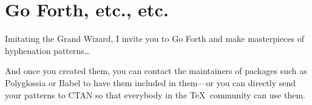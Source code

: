 \documentclass{article}
\begin{document}
\section{Go Forth, etc., etc.}
Imitating the Grand Wizard, I invite you to {\sc Go Forth} and make masterpieces of hyphenation patterns\ldots

And once you created them, you can contact the maintainers of packages such as Polyglossia or Babel to have them included in them---or you can directly send your patterns to CTAN so that everybody in the \TeX\ community can use them.



\end{document}
